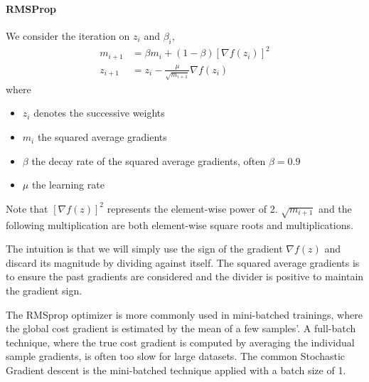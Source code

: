 \documentclass[11pt]{article}
\begin{document}
\paragraph{RMSProp} We consider the iteration on $z_i$ and $\beta_i$,
\begin{align*}
	m_{i+1} &= \beta m_i + (1-\beta) [\nabla f(z_i)]^2\\
	z_{i+1} &= z_i - \frac{\mu}{\sqrt{m_{i+1}}} \nabla f(z_i)
\end{align*}
where
\begin{itemize}
	\item $z_i$ denotes the successive weights
	\item $m_i$ the squared average gradients
	\item $\beta$ the decay rate of the squared average gradients, often $\beta = 0.9$
	\item $\mu$ the learning rate
\end{itemize}

Note that $[\nabla f(z)]^2$ represents the element-wise power of 2. $\sqrt{m_{i+1}}$ and the following multiplication are both element-wise square roots and multiplications.

The intuition is that we will simply use the sign of the gradient $\nabla f(z)$ and discard its magnitude by dividing against itself. The squared average gradients is to ensure the past gradients are considered and the divider is positive to maintain the gradient sign.

The RMSprop optimizer is more commonly used in mini-batched trainings, where the global cost gradient is estimated by the mean of a few samples'. A full-batch technique, where the true cost gradient is computed by averaging the individual sample gradients, is often too slow for large datasets. The common Stochastic Gradient descent is the mini-batched technique applied with a batch size of 1.
\end{document}

